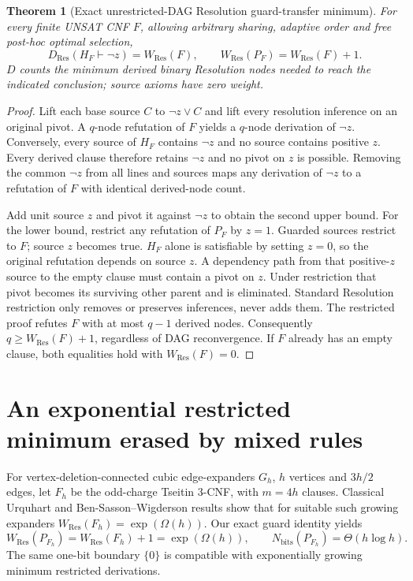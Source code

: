 \documentclass[11pt]{article}
\newtheorem{theorem}{Theorem}
\begin{document}
\begin{theorem}[Exact unrestricted-DAG Resolution guard-transfer minimum]
For every finite UNSAT CNF $F$, allowing arbitrary sharing, adaptive order and free post-hoc optimal selection,
\[
 \boxed{D_{\mathrm{Res}}(H_F\vdash\neg z)=W_{\mathrm{Res}}(F),\qquad
 W_{\mathrm{Res}}(P_F)=W_{\mathrm{Res}}(F)+1.}
\]
$D$ counts the minimum derived binary Resolution nodes needed to reach the indicated conclusion; source axioms have zero weight.
\end{theorem}
\begin{proof}
Lift each base source $C$ to $\neg z\vee C$ and lift every resolution inference on an original pivot. A $q$-node refutation of $F$ yields a $q$-node derivation of $\neg z$. Conversely, every source of $H_F$ contains $\neg z$ and no source contains positive $z$. Every derived clause therefore retains $\neg z$ and no pivot on $z$ is possible. Removing the common $\neg z$ from all lines and sources maps any derivation of $\neg z$ to a refutation of $F$ with identical derived-node count.

Add unit source $z$ and pivot it against $\neg z$ to obtain the second upper bound. For the lower bound, restrict any refutation of $P_F$ by $z=1$. Guarded sources restrict to $F$; source $z$ becomes true. $H_F$ alone is satisfiable by setting $z=0$, so the original refutation depends on source $z$. A dependency path from that positive-$z$ source to the empty clause must contain a pivot on $z$. Under restriction that pivot becomes its surviving other parent and is eliminated. Standard Resolution restriction only removes or preserves inferences, never adds them. The restricted proof refutes $F$ with at most $q-1$ derived nodes. Consequently $q\ge W_{\mathrm{Res}}(F)+1$, regardless of DAG reconvergence. If $F$ already has an empty clause, both equalities hold with $W_{\mathrm{Res}}(F)=0$.
\end{proof}

\section*{An exponential restricted minimum erased by mixed rules}
For vertex-deletion-connected cubic edge-expanders $G_h$, $h$ vertices and $3h/2$ edges, let $F_h$ be the odd-charge Tseitin 3-CNF, with $m=4h$ clauses. Classical Urquhart and Ben-Sasson--Wigderson results show that for suitable such growing expanders $W_{\mathrm{Res}}(F_h)=\exp(\Omega(h))$. Our exact guard identity yields
\[
 W_{\mathrm{Res}}(P_{F_h})=W_{\mathrm{Res}}(F_h)+1
 =\exp(\Omega(h)),\qquad N_{\mathrm{bits}}(P_{F_h})=\Theta(h\log h).
\]
The same one-bit boundary $\{0\}$ is compatible with exponentially growing minimum restricted derivations.
\end{document}
